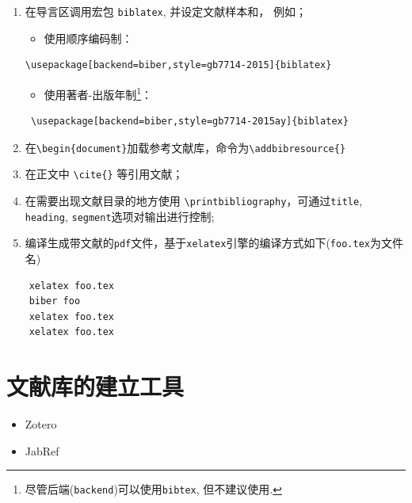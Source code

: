 \documentclass[12pt,]{krantz}
\providecommand{\tightlist}{%
  \setlength{\itemsep}{0pt}\setlength{\parskip}{0pt}}
\theoremstyle{plain}
\theoremstyle{nonumberplain}
\begin{document}
\begin{enumerate}
\def\labelenumi{\arabic{enumi}.}
\item
  在导言区调用宏包 \texttt{biblatex}, 并设定文献样本和， 例如；

  \begin{itemize}
  \tightlist
  \item
    使用顺序编码制：
  \end{itemize}

\begin{verbatim}
\usepackage[backend=biber,style=gb7714-2015]{biblatex}
\end{verbatim}

  \begin{itemize}
  \tightlist
  \item
    使用著者-出版年制\footnote{尽管后端(\texttt{backend})可以使用\texttt{bibtex}, 但不建议使用.}：
  \end{itemize}

\begin{verbatim}
 \usepackage[backend=biber,style=gb7714-2015ay]{biblatex}
\end{verbatim}
\item
  在\texttt{\textbackslash{}begin\{document\}}加载参考文献库，命令为\texttt{\textbackslash{}addbibresource\{\}}
\item
  在正文中 \texttt{\textbackslash{}cite\{\}} 等引用文献；
\item
  在需要出现文献目录的地方使用 \texttt{\textbackslash{}printbibliography}，可通过\texttt{title}, \texttt{heading}, \texttt{segment}选项对输出进行控制;
\item
  编译生成带文献的\texttt{pdf}文件，基于\texttt{xelatex}引擎的编译方式如下(\texttt{foo.tex}为文件名)
\end{enumerate}

\begin{verbatim}
    xelatex foo.tex
    biber foo
    xelatex foo.tex
    xelatex foo.tex
\end{verbatim}

\hypertarget{sec8-4}{%
\section{文献库的建立工具}\label{sec8-4}}

\begin{itemize}
\item
  Zotero
\item
  JabRef
\end{itemize}
\end{document}

